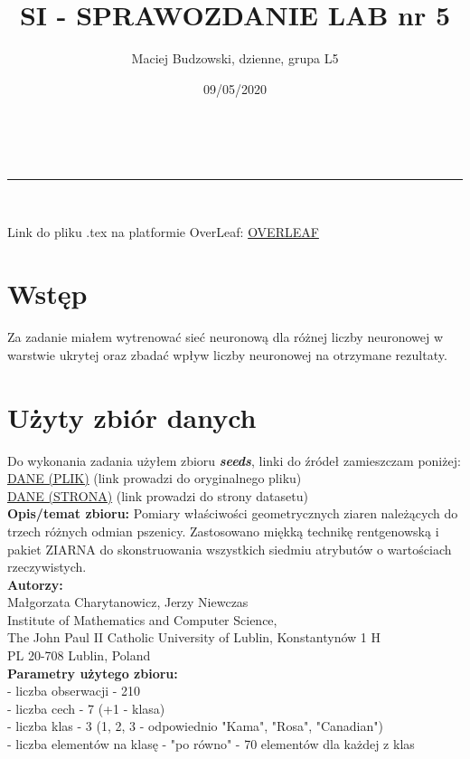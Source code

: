 \documentclass[a4paper,12pt]{article}
\makeatletter
\newcommand{\linia}{\rule{\linewidth}{0.5pt}}
\theoremstyle{mytheor}
\renewcommand{\maketitle}{
\begin{center}
\vspace{2ex}
{\huge \textsc{\@title}}
\vspace{1ex}
\\
\linia\\
\@author \hfill \@date
\vspace{4ex}
\end{center}
}
\makeatother
\begin{document}
\title{SI - SPRAWOZDANIE LAB nr 5}

\author{Maciej Budzowski, dzienne, grupa L5}

\date{09/05/2020}

\maketitle
Link do pliku .tex na platformie OverLeaf: \textcolor{red}{\href{https://www.overleaf.com/read/gtjhbdddtygc}{OVERLEAF}}\\
\section*{Wstęp}

Za zadanie miałem wytrenować sieć neuronową dla różnej liczby neuronowej w warstwie ukrytej oraz zbadać wpływ liczby neuronowej na otrzymane rezultaty.

\section*{Użyty zbiór danych}

Do wykonania zadania użyłem zbioru \textbf{\emph{seeds}}, linki do źródeł zamieszczam poniżej:\\
\textcolor{red}{\href{https://archive.ics.uci.edu/ml/machine-learning-databases/00236/seeds_dataset.txt}{DANE (PLIK)}} (link prowadzi do oryginalnego pliku)\\
\textcolor{red}{\href{https://archive.ics.uci.edu/ml/datasets/seeds}{DANE (STRONA)}} (link prowadzi do strony datasetu)\\

\textbf{Opis/temat zbioru:} Pomiary właściwości geometrycznych ziaren należących do trzech różnych odmian pszenicy. Zastosowano miękką technikę rentgenowską i pakiet ZIARNA do skonstruowania wszystkich siedmiu atrybutów o wartościach rzeczywistych.\\

\textbf{Autorzy:}\\
Małgorzata Charytanowicz, Jerzy Niewczas\\
Institute of Mathematics and Computer Science,\\
The John Paul II Catholic University of Lublin, Konstantynów 1 H\\
PL 20-708 Lublin, Poland\\

\textbf{Parametry użytego zbioru:}\\
 - liczba obserwacji - 210\\
 - liczba cech - 7 (+1 - klasa)\\
 - liczba klas - 3 (1, 2, 3 - odpowiednio "Kama", "Rosa", "Canadian")\\
 - liczba elementów na klasę - "po równo" - 70 elementów dla każdej z klas\\
\end{document}
